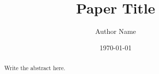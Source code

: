 \documentclass[11pt]{article}
\title{Paper Title}
\author{Author Name}
\date{\today}
\theoremstyle{definition}
\theoremstyle{remark}
\begin{document}
\maketitle
\begin{abstract}
Write the abstract here.
\end{abstract}




\printbibliography
\end{document}
